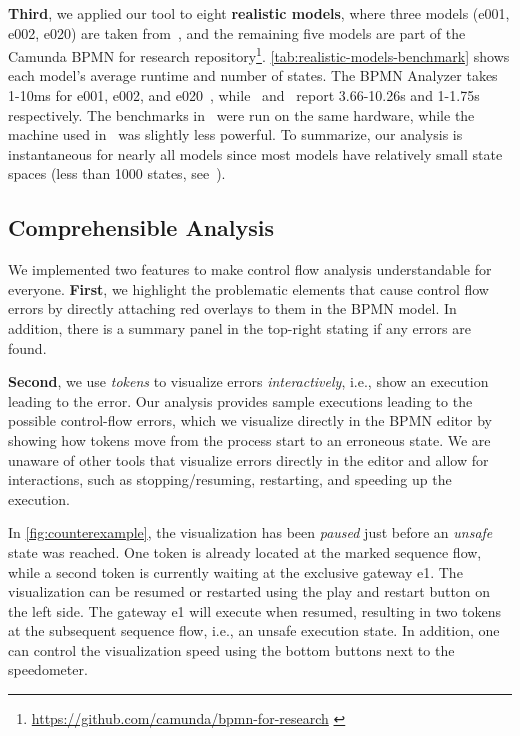 \documentclass[
onecolumn, %
]{ceurart}
\begin{document}
\textbf{Third}, we applied our tool to eight \textbf{realistic models}, where three models (e001, e002, e020) are taken from~\cite{houhouFirstOrderLogicVerification2022}, and the remaining five models are part of the Camunda BPMN for research repository\footnote{\url{https://github.com/camunda/bpmn-for-research} \label{footnote:camundaResearch}}.
\autoref{tab:realistic-models-benchmark} shows each model's average runtime and number of states.
The BPMN Analyzer takes 1-10ms for e001, e002, and e020~\cite{krauterInstantaneousComprehensibleFixable2024}, while~\cite{houhouFirstOrderLogicVerification2022} and~\cite{krauterHigherorderTransformationApproach2024} report 3.66-10.26s and 1-1.75s respectively.
The benchmarks in~\cite{krauterHigherorderTransformationApproach2024} were run on the same hardware, while the machine used in~\cite{houhouFirstOrderLogicVerification2022} was slightly less powerful.
To summarize, our analysis is instantaneous for nearly all models since most models have relatively small state spaces (less than 1000 states, see~\cite{fahlandAnalysisDemandInstantaneous2011}).

\subsection{Comprehensible Analysis}
We implemented two features to make control flow analysis understandable for everyone. 
\textbf{First}, we highlight the problematic elements that cause control flow errors by directly attaching red overlays to them in the BPMN model.
In addition, there is a summary panel in the top-right stating if any errors are found.

\textbf{Second}, we use \textit{tokens} to visualize errors \textit{interactively}, i.e., show an execution leading to the error.
Our analysis provides sample executions leading to the possible control-flow errors, which we visualize directly in the BPMN editor by showing how tokens move from the process start to an erroneous state.
We are unaware of other tools that visualize errors directly in the editor and allow for interactions, such as stopping/resuming, restarting, and speeding up the execution.

In \autoref{fig:counterexample}, the visualization has been \textit{paused} just before an \textit{unsafe} state was reached.
One token is already located at the marked sequence flow, while a second token is currently waiting at the exclusive gateway \textsf{e1}.
The visualization can be resumed or restarted using the play and restart button on the left side.
The gateway \textsf{e1} will execute when resumed, resulting in two tokens at the subsequent sequence flow, i.e., an unsafe execution state.
In addition, one can control the visualization speed using the bottom buttons next to the speedometer.
\end{document}
